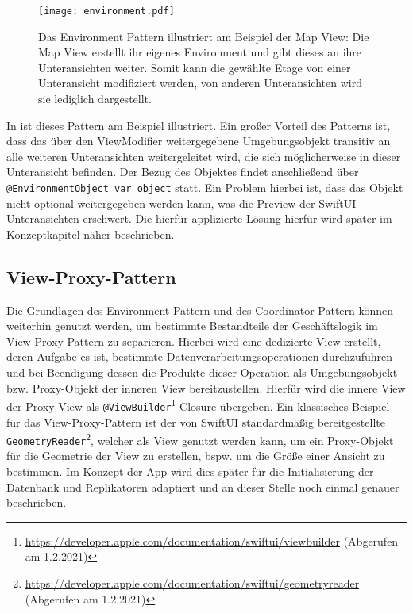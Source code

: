 \begin{figure}[H]
\texttt{[image: environment.pdf]}
\caption{Das Environment Pattern illustriert am Beispiel der Map View: Die Map View erstellt ihr eigenes Environment und gibt dieses an ihre Unteransichten weiter. Somit kann die gewählte Etage von einer Unteransicht modifiziert werden, von anderen Unteransichten wird sie lediglich dargestellt.}\label{fig:environment}
\end{figure}

\noindent In  ist dieses Pattern am Beispiel illustriert. Ein großer Vorteil des Patterns ist, dass das über den ViewModifier weitergegebene Umgebungsobjekt transitiv an alle weiteren Unteransichten weitergeleitet wird, die sich möglicherweise in dieser Unteransicht befinden. Der Bezug des Objektes findet anschließend über \texttt{@EnvironmentObject var object} statt. Ein Problem hierbei ist, dass das Objekt nicht optional weitergegeben werden kann, was die Preview der SwiftUI Unteransichten erschwert. Die hierfür applizierte Lösung hierfür wird später im Konzeptkapitel näher beschrieben.

\subsection{View-Proxy-Pattern}

Die Grundlagen des Environment-Pattern und des Coordinator-Pattern können weiterhin genutzt werden, um bestimmte Bestandteile der Geschäftslogik im View-Proxy-Pattern zu separieren. Hierbei wird eine dedizierte View erstellt, deren Aufgabe es ist, bestimmte Datenverarbeitungsoperationen durchzuführen und bei Beendigung dessen die Produkte dieser Operation als Umgebungsobjekt bzw. Proxy-Objekt der inneren View bereitzustellen. Hierfür wird die innere View der Proxy View als \texttt{@ViewBuilder}\footnote{\url{https://developer.apple.com/documentation/swiftui/viewbuilder} (Abgerufen am 1.2.2021)}-Closure übergeben. Ein klassisches Beispiel für das View-Proxy-Pattern ist der von SwiftUI standardmäßig bereitgestellte \texttt{GeometryReader}\footnote{\url{https://developer.apple.com/documentation/swiftui/geometryreader} (Abgerufen am 1.2.2021)}, welcher als View genutzt werden kann, um ein Proxy-Objekt für die Geometrie der View zu erstellen, bspw. um die Größe einer Ansicht zu bestimmen. Im Konzept der App wird dies später für die Initialisierung der Datenbank und Replikatoren adaptiert und an dieser Stelle noch einmal genauer beschrieben.

